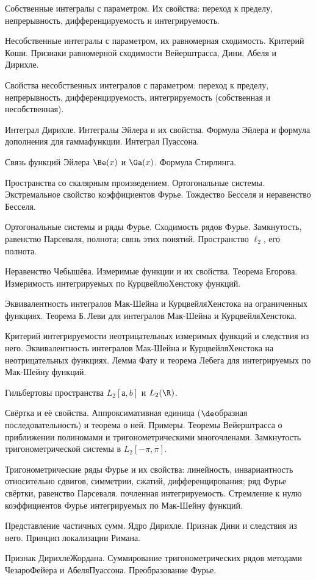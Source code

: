 \documentclass[a4paper]{article}
\begin{document}
\begin{nums}{-4}
\item Собственные интегралы с параметром. Их свойства: переход к пределу, непрерывность, дифференцируемость и интегрируемость.
\item Несобственные интегралы с параметром, их равномерная сходимость. Критерий Коши. Признаки равномерной сходимости Вейерштрасса,
Дини, Абеля и Дирихле.
\item Свойства несобственных интегралов с параметром: переход к пределу, непрерывность, дифференцируемость, интегрируемость
(собственная и несобственная).
\item Интеграл Дирихле. Интегралы Эйлера и их свойства. Формула Эйлера и формула дополнения для гамма\д функции. Интеграл Пуассона.
\item Связь функций Эйлера $\Be(x)$ и $\Ga(x)$. Формула Стирлинга.
\item Пространства со скалярным произведением. Ортогональные системы. Экстремальное свойство коэффициентов Фурье. Тождество
Бесселя и неравенство Бесселя.
\item Ортогональные системы и ряды Фурье. Сходимость рядов Фурье. Замкнутость, равенство Парсеваля, полнота; связь этих понятий.
Пространство $\ell_2$, его полнота.
\item Неравенство Чебышёва. Измеримые функции и их свойства. Теорема Егорова. Измеримость интегрируемых по Курцвейлю\ч Хенстоку функций.
\item Эквивалентность интегралов Мак-Шейна и Курцвейля\ч Хенстока на ограниченных функциях. Теорема Б.\,Леви для интегралов
Мак-Шейна и Курцвейля\ч Хенстока.
\item Критерий интегрируемости неотрицательных измеримых функций и следствия из него. Эквивалентность интегралов Мак-Шейна и
Курцвейля\ч Хенстока на неотрицательных функциях. Лемма Фату и теорема Лебега для интегрируемых по Мак-Шейну функций.
\item Гильбертовы пространства $L_2[а,b]$ и $L_2(\R)$.
\item Свёртка и её свойства. Аппроксимативная единица ($\de$\д образная последовательность) и теорема о ней. Примеры. Теоремы
Вейерштрасса о приближении полиномами и тригонометрическими многочленами. Замкнутость тригонометрической системы в $L_2[-\pi,\pi]$.
\item Тригонометрические ряды Фурье и их свойства: линейность, инвариантность относительно сдвигов, симметрии, сжатий,
дифференцирования; ряд Фурье свёртки, равенство Парсеваля. почленная интегрируемость. Стремление к нулю коэффициентов Фурье
интегрируемых по Мак-Шейну функций.
\item Представление частичных сумм. Ядро Дирихле. Признак Дини и следствия из него. Принцип локализации Римана.
\item Признак Дирихле\ч Жордана. Суммирование тригонометрических рядов методами Чезаро\ч Фейера и Абеля\ч Пуассона.
Преобразование Фурье.
\end{nums}
\end{document}

